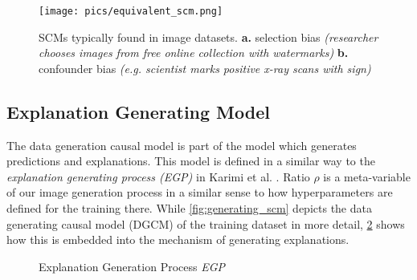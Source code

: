 \begin{figure}[t!]
    \centering
    \texttt{[image: pics/equivalent\_scm.png]}
    \caption[Selection vs. Confounder Bias]{SCMs typically found in image datasets.
    \textbf{a.} selection bias \textit{(researcher chooses images from free online collection with watermarks)}
    \textbf{b.} confounder bias \textit{(e.g. scientist marks positive x-ray scans with sign)}}
    \label{fig:equivalent_scm}
\end{figure}

\subsection{Explanation Generating Model}
The data generation causal model is part of the model which generates predictions and explanations.
This model is defined in a similar way to the \textit{explanation generating process (EGP)} in Karimi et al. \cite{Karimi2023}.
Ratio $\rho$ is a meta-variable of our image generation process in a similar sense to how hyperparameters are defined for the training there. While \cref{fig:generating_scm} depicts the data generating causal model (DGCM) of the training dataset in more detail, \cref{fig:egp} shows how this is embedded into the mechanism of generating explanations. 

\begin{figure}[t!]
    \centering
    \caption[Explanation Generation Process (EGP)]{Explanation Generation Process \textit{EGP}}
    \label{fig:egp}
\end{figure}


